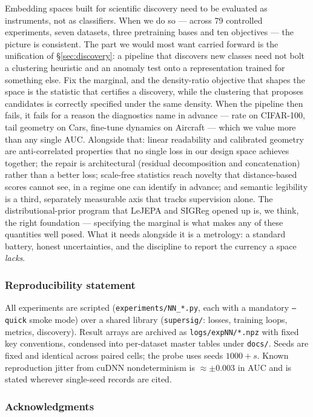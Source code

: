 \documentclass{article}
\begin{document}
Embedding spaces built for scientific discovery need to be evaluated as
instruments, not as classifiers. When we do so --- across 79 controlled
experiments, seven datasets, three pretraining bases and ten objectives --- the
picture is consistent. The part we would most want carried forward is the
unification of \S\ref{sec:discovery}: a pipeline that discovers new classes
need not bolt a clustering heuristic and an anomaly test onto a representation
trained for something else. Fix the marginal, and the density-ratio objective
that shapes the space is the statistic that certifies a discovery, while the
clustering that proposes candidates is correctly specified under the same
density. When the pipeline then fails, it fails for a reason the
diagnostics name in advance --- rate on CIFAR-100, tail geometry on Cars,
fine-tune dynamics on Aircraft --- which we value more than any single AUC.
Alongside that: linear readability and calibrated geometry are
anti-correlated properties that no single loss in our design space achieves
together; the repair is architectural (residual decomposition and
concatenation) rather than a better loss; scale-free statistics reach novelty
that distance-based scores cannot see, in a regime one can identify in advance;
and semantic legibility is a third, separately measurable axis that tracks
supervision alone. The distributional-prior program that LeJEPA and SIGReg
opened up is, we think, the right foundation --- specifying the marginal is
what makes any of these quantities well posed. What it needs alongside it is a
metrology: a standard battery, honest uncertainties, and the discipline to
report the currency a space \emph{lacks}.

\subsubsection*{Reproducibility statement}

All experiments are scripted (\texttt{experiments/NN\_*.py}, each with a
mandatory \texttt{--quick} smoke mode) over a shared library
(\texttt{supersig/}: losses, training loops, metrics, discovery). Result arrays
are archived as \texttt{logs/expNN/*.npz} with fixed key conventions, condensed
into per-dataset master tables under \texttt{docs/}. Seeds are fixed and
identical across paired cells; the probe uses seeds $1000{+}s$. Known
reproduction jitter from cuDNN nondeterminism is $\approx\pm0.003$ in AUC and is
stated wherever single-seed records are cited.

\subsubsection*{Acknowledgments}
\end{document}
